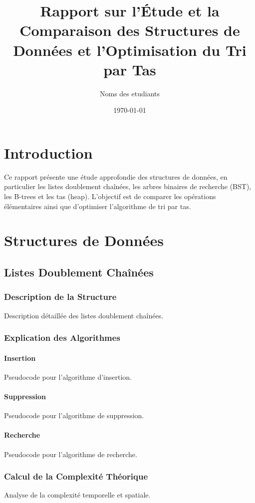 \documentclass[a4paper, 12pt]{article}
\title{Rapport sur l'Étude et la Comparaison des Structures de Données et l'Optimisation du Tri par Tas}
\author{Noms des etudiants}
\date{\today}
\begin{document}
\maketitle

\section{Introduction}
Ce rapport présente une étude approfondie des structures de données, en particulier les listes doublement chaînées, les arbres binaires de recherche (BST), les B-trees et les tas (heap). L'objectif est de comparer les opérations élémentaires ainsi que d'optimiser l'algorithme de tri par tas.

\section{Structures de Données}
\subsection{Listes Doublement Chaînées}
\subsubsection{Description de la Structure}
Description détaillée des listes doublement chaînées.

\subsubsection{Explication des Algorithmes}
\paragraph{Insertion}
Pseudocode pour l'algorithme d'insertion.

\paragraph{Suppression}
Pseudocode pour l'algorithme de suppression.

\paragraph{Recherche}
Pseudocode pour l'algorithme de recherche.

\subsubsection{Calcul de la Complexité Théorique}
Analyse de la complexité temporelle et spatiale.
\end{document}
